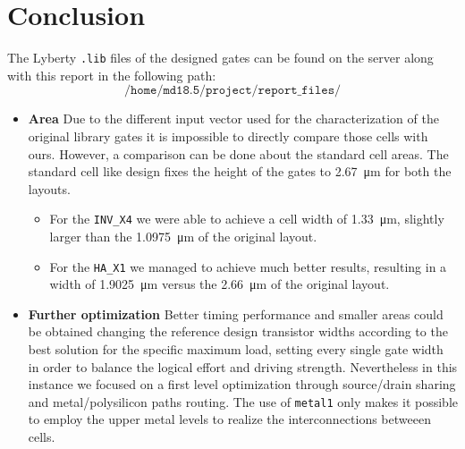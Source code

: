 \documentclass[a4paper]{article}
\newcommand{\inv}{\texttt{INV\_X4}\xspace}
\newcommand{\ha}{\texttt{HA\_X1}\xspace}
\begin{document}
\section{Conclusion}

The Lyberty \texttt{.lib} files of the designed gates can be found on the server along with this report in the following path:
\begin{equation*}
	\texttt{/home/md18.5/project/report\_files/}
\end{equation*}
\begin{itemize}
	\item \textbf{Area} Due to the different input vector used for the characterization of the original library gates it is impossible to directly compare those cells with ours. However, a comparison can be done about the standard cell areas. The standard cell like design fixes the height of the gates to \SI{2.67}{\micro\meter} for both the layouts.
	\begin{itemize}
		\item For the \inv we were able to achieve a cell width of \SI{1.33}{\micro\meter}, slightly larger than the \SI{1.0975}{\micro\meter} of the original layout.

		\item For the \ha we managed to achieve much better results, resulting in a width of \SI{1.9025}{\micro\meter} versus the \SI{2.66}{\micro\meter} of the original layout.
	\end{itemize}

	\item \textbf{Further optimization} Better timing performance and smaller areas could be obtained changing the reference design transistor widths according to the best solution for the specific maximum load, setting every single gate width in order to balance the logical effort and driving strength. Nevertheless in this instance we focused on a first level optimization through source/drain sharing and metal/polysilicon paths routing. The use of \texttt{metal1} only makes it possible to employ the upper metal levels to realize the interconnections betweeen cells.
\end{itemize}
\end{document}
